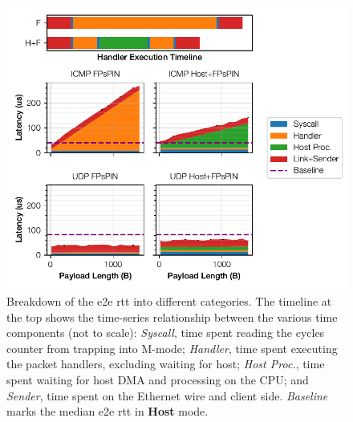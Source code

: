 \begin{figure}[tp]
    \centering
    \includegraphics{thesis/figures/pingpong-breakdown.pdf}
    \caption{Breakdown of the \ac{e2e} \ac{rtt} into different categories.  The timeline at the top shows the time-series relationship between the various time components (not to scale): \emph{Syscall}, time spent reading the cycles counter from trapping into M-mode; \emph{Handler}, time spent executing the packet handlers, excluding waiting for host; \emph{Host Proc.}, time spent waiting for host DMA and processing on the CPU; and \emph{Sender}, time spent on the Ethernet wire and client side.  \emph{Baseline} marks the median \ac{e2e} \ac{rtt} in \textbf{Host} mode.} \label{fig:pingpong-breakdown}
\end{figure}


